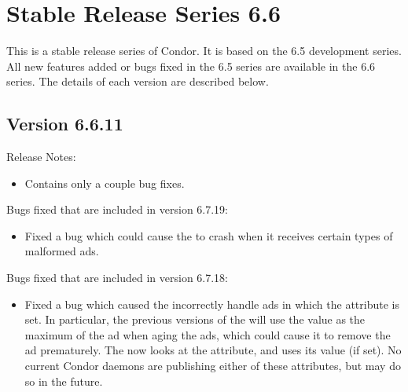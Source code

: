 \section{\label{sec:History-6-6}Stable Release Series 6.6}

This is a stable release series of Condor.
It is based on the 6.5 development series.
All new features added or bugs fixed in the 6.5 series are available
in the 6.6 series.
The details of each version are described below.

\subsection{\label{sec:New-6-6-11}Version 6.6.11}

\noindent Release Notes:

\begin{itemize}

\item Contains only a couple bug fixes.

\end{itemize}

%
%
%

\noindent Bugs fixed that are included in version 6.7.19:

\begin{itemize}

\item Fixed a bug which could cause the  to crash
  when it receives certain types of malformed ads.

\end{itemize}

\noindent Bugs fixed that are included in version 6.7.18:

\begin{itemize}

\item Fixed a bug which caused the  incorrectly
  handle ads in which the  attribute is set.
  In particular, the previous versions of the  will
  use the  value as the maximum 
  of the ad when aging the ads, which could cause it to remove the ad
  prematurely.
  The  now looks at the 
  attribute, and uses its value (if set).
  \Note No current Condor daemons are publishing either of these
  attributes, but may do so in the future.

\end{itemize}

